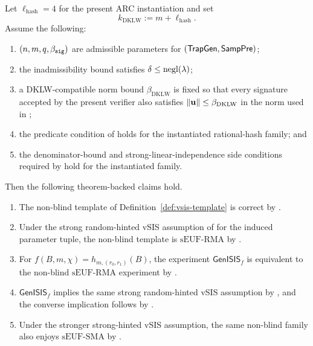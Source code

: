 \begin{lemma}\label{lem:vsis-unforgeability}
Let \(\ell_{\mathrm{hash}}=4\) for the present ARC instantiation and set
\[
k_{\mathrm{DKLW}}:=m+\ell_{\mathrm{hash}}.
\]
Assume the following:
\begin{enumerate}[leftmargin=1.25em]
    \item \((n,m,q,\beta_{\mathtt{sig}})\) are admissible parameters for \((\mathsf{TrapGen},\mathsf{SampPre})\);
    \item the inadmissibility bound satisfies \(\delta\le \mathrm{negl}(\lambda)\);
    \item a DKLW-compatible norm bound \(\beta_{\mathrm{DKLW}}\) is fixed so that every signature accepted by the
    present verifier also satisfies \(\|\mathbf{u}\|\le \beta_{\mathrm{DKLW}}\) in the norm used in \cite{EPRINT:DKLW25};
    \item the predicate condition of \cite[Definition~7]{EPRINT:DKLW25} holds for the instantiated rational-hash
    family; and
    \item the denominator-bound and strong-linear-independence side conditions required by
    \cite[Theorems~4--8 and Corollary~1]{EPRINT:DKLW25} hold for the instantiated family.
\end{enumerate}
Then the following theorem-backed claims hold.
\begin{enumerate}[leftmargin=1.25em]
    \item The non-blind template of Definition~\ref{def:vsis-template} is correct by \cite[Theorem~4]{EPRINT:DKLW25}.
    \item Under the strong random-hinted vSIS assumption of \cite{EPRINT:DKLW25} for the induced parameter tuple, the
    non-blind template is \(\mathrm{sEUF\mbox{-}RMA}\) by \cite[Theorem~5]{EPRINT:DKLW25}.
    \item For \(f(B,m,\chi)=h_{m,(r_0,r_1)}(B)\), the experiment \(\mathsf{GenISIS}_f\) is equivalent to the non-blind
    \(\mathrm{sEUF\mbox{-}RMA}\) experiment by \cite[Theorem~7]{EPRINT:DKLW25}.
    \item \(\mathsf{GenISIS}_f\) implies the same strong random-hinted vSIS assumption by
    \cite[Theorem~8]{EPRINT:DKLW25}, and the converse implication follows by \cite[Corollary~1]{EPRINT:DKLW25}.
    \item Under the stronger strong-hinted vSIS assumption, the same non-blind family also enjoys
    \(\mathrm{sEUF\mbox{-}SMA}\) by \cite[Theorem~5]{EPRINT:DKLW25}.
\end{enumerate}
\end{lemma}

